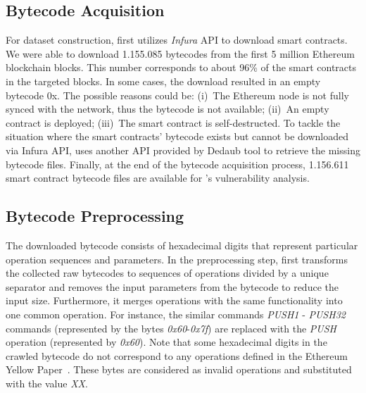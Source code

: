 \subsection{Bytecode Acquisition}
\label{sec:implementation:preclassification}
\vspace{-0.3em}
For dataset construction, \datatool{} first utilizes \textit{Infura} API to download smart contracts. We were able to download 1.155.085 bytecodes from the first 5 million Ethereum blockchain blocks. 
This number corresponds to about 96\% of the smart contracts in the targeted blocks.  
In some cases, the download resulted in an empty bytecode 0x. The possible reasons could be: (i)~The Ethereum node is not fully synced with the network, thus the bytecode is not available; (ii)~An empty contract is deployed; (iii)~The smart contract is self-destructed. 
To tackle the situation where the smart contracts' bytecode exists but cannot be downloaded via Infura API, \datatool{} uses another API provided by Dedaub tool to retrieve the missing bytecode files. 
Finally, at the end of the bytecode acquisition process, 1.156.611 smart contract bytecode files are available for \sys{}'s vulnerability analysis.  

\vspace{-1em}
\subsection{Bytecode Preprocessing}
\label{sec:implementation:preclassification}
\vspace{-0.3em}

The downloaded bytecode consists of hexadecimal digits that represent particular operation sequences and parameters. 
In the preprocessing step, \datatool{} first transforms the collected raw bytecodes to sequences of operations divided by a unique separator and removes the input parameters from the bytecode to reduce the input size.
Furthermore, it merges operations with the same functionality into one common operation. 
For instance, the similar commands \textit{PUSH1} - \textit{PUSH32} commands (represented by the bytes \textit{0x60}-\textit{0x7f}) are replaced with the \textit{PUSH} operation (represented by \textit{0x60}).
Note that some hexadecimal digits in the crawled bytecode do not correspond to any operations defined in the Ethereum Yellow Paper~\cite{ethereum-yellowpaper}. These bytes are considered as invalid operations and substituted with the value \textit{XX}.

\vspace{-0.4em}
